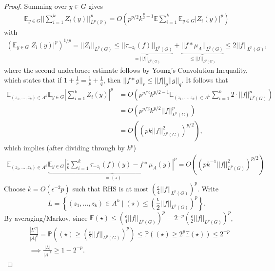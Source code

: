 \documentclass{article}
\theoremstyle{definition}
\begin{document}
\begin{proof}
    Summing over $y \in G$ gives 
    \begin{align*}
        \mathbb{E}_{y \in G} ||\sum_{i=1}^{k} Z_i(y)||_{L^p(\mathbb{P})}^{p} = O \left(p^{p/2}k^{\frac{p}{2}-1}\mathbb{E}\sum_{i=1}^{k} \mathbb{E}_{y \in G}\left|Z_i(y)\right|^p \right)
    \end{align*}
    with 
    \begin{align*}
        \left(\mathbb{E}_{y \in G}\left|Z_i(y)\right|^p \right)^{1/p} = ||Z_i||_{L^p(G)} \le  \underbrace{||\tau_{-z_i}(f)||_{L^p(G)}}_{= ||f||_{L^p(G)}} + \underbrace{||f * \mu_A||_{L^p(G)}}_{\le ||f||_{L^p(G)}} \le 2||f||_{L^p(G)},
    \end{align*}
    where the second underbrace estimate follows by Young's Convolution Inequality, which states that if $1+\frac{1}{r}=\frac{1}{p}+\frac{1}{q}$, then $||f * g||_r \le ||f||_{p} ||g||_{q}$. It follows that
    \begin{align*}
        \mathbb{E}_{(z_1,\ldots,z_k) \in A^k}\mathbb{E}_{y \in G} |\sum_{i=1}^{k} Z_i(y)|^p &= O \left(p^{p/2}k^{p/2-1}\mathbb{E}_{(z_1,\ldots,z_k) \in A^k}\sum_{i=1}^{k} 2\cdot ||f||^p_{L^p(G)} \right) \\
        &= O \left(p^{p/2}k^{p/2}||f||_{L^p(G)}^p \right)\\
        &= O \left((pk||f||^2_{L^p(G)})^{p/2}\right),
    \end{align*}
    which implies (after dividing through by $k^{p}$) 
    \begin{align*}
        \mathbb{E}_{(z_1,\ldots,z_k) \in A^k}\underbrace{\mathbb{E}_{y \in G}\left|\frac{1}{k}\sum_{i=1}^{k} \tau_{-z_i}(f)(y) - f * \mu_A (y)\right|^p}_{:= (\star)} = O \left((pk^{-1}||f||^2_{L^p(G)})^{p/2}\right)
    \end{align*}
    Choose $k = O(\epsilon^{-2}p)$ such that RHS is at most $\left(\frac{\epsilon}{4}||f||_{L^p(G)}\right)^{p}$. Write $$L = \left\{(z_1,\ldots,z_k) \in A^k \mid (\star) \le \left(\frac{\epsilon}{2}||f||_{L^p(G)}\right)^p \right\}.$$
    By averaging/Markov, since $\mathbb{E}(\star)\le \left(\frac{\epsilon}{4}||f||_{L^p(G)}\right)^p = 2^{-p} \left(\frac{\epsilon}{2}||f||_{L^p(G)}\right)^p$, 
    \begin{align*}
        &\frac{\left|L^C\right|}{\left|A\right|^k} = \mathbb{P}\left((\star)\ge \left(\frac{\epsilon}{2}||f||_{L^p(G)}\right)^p\right) \le \mathbb{P}\left((\star)\ge 2^{p}\mathbb{E}(\star)\right) \le 2^{-p} \\
        &\implies \frac{\left|L\right|}{\left|A\right|^k}\ge 1-2^{-p}.
    \end{align*}

\end{proof}
\end{document}
